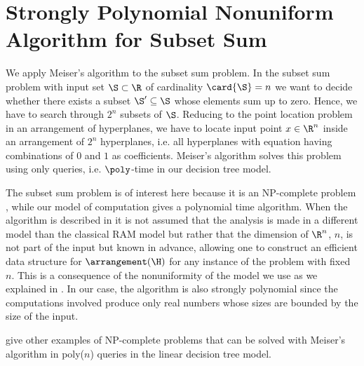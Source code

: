 \section[Strongly Polynomial Nonuniform Algorithm \dots]{Strongly Polynomial Nonuniform Algorithm for Subset Sum}

We apply Meiser's algorithm to the subset sum problem. In the subset sum
problem with input set $\S \subset \R$ of cardinality $\card{\S} = n$ we want to
decide whether there exists a subset $\S' \subseteq \S$ whose elements sum up to zero. Hence, we have
to search through $2^n$ subsets of $\S$. Reducing to the point location problem
in an arrangement of hyperplanes, we have to locate input point $x \in
\R^n$ inside an arrangement of $2^n$ hyperplanes, i.e. all hyperplanes with
equation having combinations of $0$ and $1$ as coefficients. Meiser's algorithm
solves this problem using only  queries, i.e. $\poly$-time
in our decision tree model.

The subset sum problem is of interest here because it is an NP-complete problem
\cite{karp:1972}, while our model of computation gives a polynomial time
algorithm. When the algorithm is described in \cite{burgisser:1997} it is not
assumed that the analysis is made in a different model than the classical
RAM model but rather that the dimension of $\R^n$, $n$, is not part of the input
but known in advance, allowing one to construct an efficient data structure for
$\arrangement(\H)$ for any instance of the problem with fixed $n$.
This is a consequence of the nonuniformity of the model we use as we explained
in . In our case, the algorithm is
also strongly polynomial since the computations involved produce only real
numbers whose sizes are bounded by the size of the input.

\citet*{meiser:1993,burgisser:1997} give other examples of
NP-complete problems that can be solved with Meiser's algorithm in poly(\(n\))
queries in the linear decision tree model.
